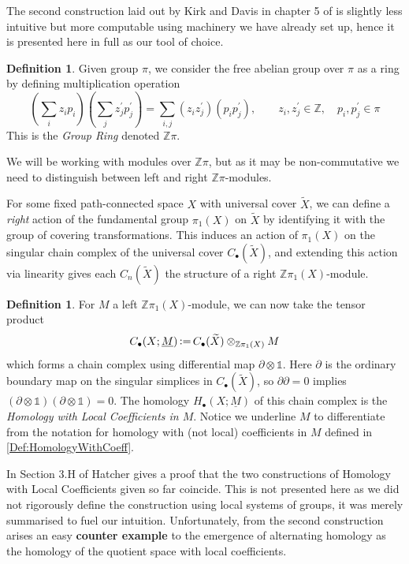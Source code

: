 \documentclass[11pt,a4paper,twoside]{article}
\theoremstyle{plain}
\theoremstyle{definition}
\newtheorem{defn}[thm]{Definition}
\theoremstyle{definition}
\theoremstyle{definition}
\theoremstyle{definition}
\theoremstyle{definition}
\DeclareMathOperator{\coloneqq}{\vcentcolon=}
\begin{document}
The second construction laid out by Kirk and Davis in chapter 5 of \cite{LNiAT} is slightly less intuitive but more computable using machinery we have already set up, hence it is presented here in full as our tool of choice.
\vspace{2mm}
\begin{defn}
Given group $\pi$, we consider the free abelian group over $\pi$ as a ring by defining multiplication operation
$$(\sum_iz_ip_i)(\sum_jz^\prime_jp^\prime_j)=\sum_{i,j}(z_iz^\prime_j)(p_ip^\prime_j), \quad\quad z_i,z^\prime_j\in\mathbb{Z},\quad p_i,p^\prime_j\in\pi$$
This is the \emph{Group Ring} denoted $\mathbb{Z}\pi$.
\end{defn}
We will be working with modules over $\mathbb{Z}\pi$, but as it may be non-commutative we need to distinguish between left and right $\mathbb{Z}\pi$-modules.

For some fixed path-connected space $X$ with universal cover $\widetilde{X}$, we can define a \emph{right} action of the fundamental group $\pi_1(X)$ on $\widetilde{X}$ by identifying it with the group of covering transformations. This induces an action of $\pi_1(X)$ on the singular chain complex of the universal cover $C_\bullet(\widetilde{X})$, and extending this action via linearity gives each $C_n(\widetilde{X})$ the structure of a right $\mathbb{Z}\pi_1(X)$-module.

\vspace{2mm}
\begin{defn}
For $M$ a left $\mathbb{Z}\pi_1(X)$-module, we can now take the tensor product
$$C_\bullet(X;\underline{M})\coloneqq C_\bullet(\widetilde{X})\otimes_{\mathbb{Z}\pi_1(X)}M$$
which forms a chain complex using differential map $\partial\otimes\mathbb{1}$. Here $\partial$ is the ordinary boundary map on the singular simplices in $C_\bullet(\widetilde{X})$, so $\partial\partial\!=\!0$ implies $(\partial\otimes\mathbb{1})(\partial\otimes\mathbb{1})\!=\!0$. The homology $H_\bullet(X;\underline{M})$ of this chain complex is the \emph{Homology with Local Coefficients in $M$}. Notice we underline $M$ to differentiate from the notation for homology with (not local) coefficients in $M$ defined in \ref{Def:HomologyWithCoeff}.
\end{defn}

In Section 3.H of \cite{algebraictopology} Hatcher gives a proof that the two constructions of Homology with Local Coefficients given so far coincide. This is not presented here as we did not rigorously define the construction using local systems of groups, it was merely summarised to fuel our intuition. Unfortunately, from the second construction arises an easy \textbf{{counter example}} to the emergence of alternating homology as the homology of the quotient space with local coefficients.
\end{document}
